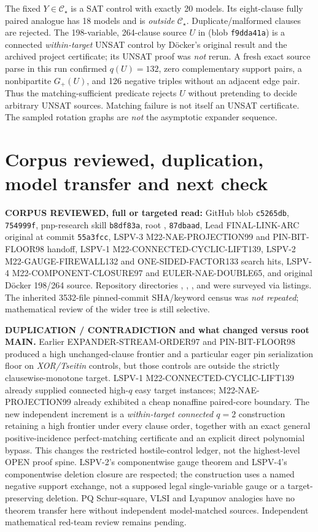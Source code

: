 \documentclass[11pt]{article}
\newcommand{\CS}{\mathcal C_\star}
\begin{document}
The fixed $Y\in\CS$ is a SAT control with exactly 20 models. Its eight-clause fully paired analogue has 18 models and is \emph{outside} $\CS$. Duplicate/malformed clauses are rejected. The 198-variable, 264-clause source $U$ in  (blob \texttt{f9dda41a}) is a connected \emph{within-target} UNSAT control by D\"ocker's original result and the archived project certificate; its UNSAT proof was \emph{not} rerun. A fresh exact source parse in this run confirmed $q(U)=132$, zero complementary support pairs, a nonbipartite $G_+(U)$, and 126 negative triples without an adjacent edge pair. Thus the matching-sufficient predicate rejects $U$ without pretending to decide arbitrary UNSAT sources. Matching failure is not itself an UNSAT certificate. The sampled rotation graphs are \emph{not} the asymptotic expander sequence.

\section{Corpus reviewed, duplication, model transfer and next check}
\noindent\textbf{CORPUS REVIEWED, full or targeted read:} GitHub  blob \texttt{c5265db},  \texttt{754999f}, pnp-research skill \texttt{b8df83a}, root ,  \texttt{87dbaad}, Lead FINAL-LINK-ARC original at commit \texttt{55a3fcc}, LSPV-3 M22-NAE-PROJECTION99 and PIN-BIT-FLOOR98 handoff, LSPV-1 M22-CONNECTED-CYCLIC-LIFT139, LSPV-2 M22-GAUGE-FIREWALL132 and ONE-SIDED-FACTOR133 search hits, LSPV-4 M22-COMPONENT-CLOSURE97 and EULER-NAE-DOUBLE65, and original D\"ocker 198/264 source. Repository directories , , , and  were surveyed via listings. The inherited 3532-file pinned-commit SHA/keyword census was \emph{not repeated}; mathematical review of the wider tree is still selective.

\noindent\textbf{DUPLICATION / CONTRADICTION and what changed versus root MAIN.} Earlier EXPANDER-STREAM-ORDER97 and PIN-BIT-FLOOR98 produced a high unchanged-clause frontier and a particular eager pin serialization floor on \emph{XOR/Tseitin} controls, but those controls are outside the strictly clausewise-monotone target. LSPV-1 M22-CONNECTED-CYCLIC-LIFT139 already supplied connected high-$q$ easy target instances; M22-NAE-PROJECTION99 already exhibited a cheap nonaffine paired-core boundary. The new independent increment is a \emph{within-target connected $q=2$} construction retaining a high frontier under every clause order, together with an exact general positive-incidence perfect-matching certificate and an explicit direct polynomial bypass. This changes the restricted hostile-control ledger, not the highest-level OPEN proof spine. LSPV-2's componentwise gauge theorem and LSPV-4's componentwise deletion closure are respected; the construction uses a named negative support exchange, not a supposed legal single-variable gauge or a target-preserving deletion. PQ Schur-square, VLSI and Lyapunov analogies have no theorem transfer here without independent model-matched sources. Independent mathematical red-team review remains pending.
\end{document}
